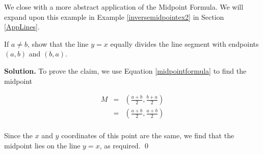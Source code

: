 \documentclass{ximera}
\begin{document}

\label{inversemidpoint}

We close with a more abstract application of the Midpoint Formula.  We will expand upon this example in Example \ref{inversemidpointex2} in Section \ref{AppLines}.  

\begin{example} \label{inversemidpointex1} If $a \neq b$, show that the line $y = x$ equally divides the line segment with endpoints $(a,b)$ and $(b,a)$.

 

{\bf Solution.}  To prove the claim, we use Equation \ref{midpointformula} to find the midpoint  

\setlength{\extrarowheight}{10pt}

\[ \begin{array}{rcl}

 M & = & \left( \frac{a+b}{2},  \frac{b+a}{2} \right) \\
   & = & \left( \frac{a+b}{2},  \frac{a+b}{2} \right)  \\ \end{array} \]

Since the $x$ and $y$ coordinates of this point are the same, we find that the midpoint lies on the line $y=x$, as required. \qed

\end{example}



\closegraphsfile
\end{document}
